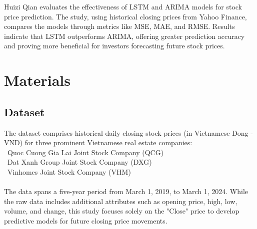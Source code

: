 \documentclass{ieeeojies}
\begin{document}
Huizi Qian evaluates the effectiveness of LSTM and ARIMA models for stock price prediction. The study, using historical closing prices from Yahoo Finance, compares the models through metrics like MSE, MAE, and RMSE. Results indicate that LSTM outperforms ARIMA, offering greater prediction accuracy and proving more beneficial for investors forecasting future stock prices.\\

\section{Materials}
\subsection{Dataset}

The dataset comprises historical daily closing stock prices (in Vietnamese Dong - VND) for three prominent Vietnamese real estate companies:
 \\
  \indent\textbullet\ Quoc Cuong Gia Lai Joint Stock Company (QCG) \\
  \indent\textbullet\ Dat Xanh Group Joint Stock Company (DXG) \\
  \indent\textbullet\ Vinhomes Joint Stock Company (VHM) \\
  \\
The data spans a five-year period from March 1, 2019, to March 1, 2024.  While the raw data includes additional attributes such as opening price, high, low, volume, and change, this study focuses solely on the "Close" price to develop predictive models for future closing price movements.
\end{document}
